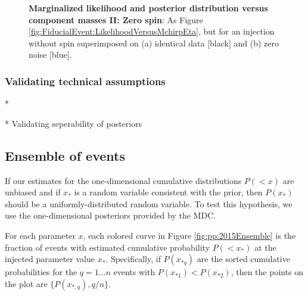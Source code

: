 \begin{figure}
\caption{\textbf{Marginalized likelihood and posterior distribution versus component masses II: Zero spin}:
As Figure \ref{fig:FiducialEvent:LikelihoodVersusMchirpEta}, but for an injection without spin superimposed on (a) identical data
[black] and (b) zero noise [blue]. 
}
\end{figure}



\subsubsection{Validating technical assumptions}



* 

* Validating seperability of posteriors

\subsection{Ensemble of events}

If our estimates for the one-dimensional cumulative distributions $P(<x)$ are unbiased and if $x_*$ is a random variable
consistent with the prior, then $P(x_*)$ should be a uniformly-distributed random variable.   To test this hypothesis,
we use the one-dimensional posteriors provided by the MDC.


For each parameter $x$, each colored curve in Figure  \ref{fig:pp:2015Ensemble} is  the fraction of events with
estimated cumulative probability $P(<x_*)$ at the injected parameter value $x_*$.  
Specifically, if $P(x_{*q})$ are the sorted cumulative probabilities for the $q=1\ldots n$ events with
$P(x_{*1})<P(x_{*2})$, then the points on the plot are $\{P(x_{*,q}),q/n\}$.  
%

